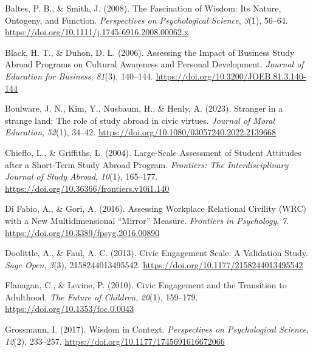 \documentclass[
  man,
  floatsintext,
  longtable,
  nolmodern,
  notxfonts,
  notimes,
  colorlinks=true,linkcolor=blue,citecolor=blue,urlcolor=blue]{apa7}
\newlength{\cslhangindent}
\newenvironment{CSLReferences}[2] %
 {\begin{list}{}{%
  \setlength{\itemindent}{0pt}
  \setlength{\leftmargin}{0pt}
  \setlength{\parsep}{0pt}
  \ifodd #1
   \setlength{\leftmargin}{\cslhangindent}
   \setlength{\itemindent}{-1\cslhangindent}
  \fi
  \setlength{\itemsep}{#2\baselineskip}}}
 {\end{list}}
\begin{document}
\label{refs}
\begin{CSLReferences}{1}{0}
Baltes, P. B., \& Smith, J. (2008). The {Fascination} of {Wisdom}: {Its
Nature}, {Ontogeny}, and {Function}. \emph{Perspectives on Psychological
Science}, \emph{3}(1), 56--64.
\url{https://doi.org/10.1111/j.1745-6916.2008.00062.x}

Black, H. T., \& Duhon, D. L. (2006). Assessing the {Impact} of
{Business Study Abroad Programs} on {Cultural Awareness} and {Personal
Development}. \emph{Journal of Education for Business}, \emph{81}(3),
140--144. \url{https://doi.org/10.3200/JOEB.81.3.140-144}

Boulware, J. N., Kim, Y., Nusbaum, H., \& Henly, A. (2023). Stranger in
a strange land: {The} role of study abroad in civic virtues.
\emph{Journal of Moral Education}, \emph{52}(1), 34--42.
\url{https://doi.org/10.1080/03057240.2022.2139668}

Chieffo, L., \& Griffiths, L. (2004). Large-{Scale Assessment} of
{Student Attitudes} after a {Short-Term Study Abroad Program}.
\emph{Frontiers: The Interdisciplinary Journal of Study Abroad},
\emph{10}(1), 165--177.
\url{https://doi.org/10.36366/frontiers.v10i1.140}

Di Fabio, A., \& Gori, A. (2016). Assessing {Workplace Relational
Civility} ({WRC}) with a {New Multidimensional} {``{Mirror}''}
{Measure}. \emph{Frontiers in Psychology}, \emph{7}.
\url{https://doi.org/10.3389/fpsyg.2016.00890}

Doolittle, A., \& Faul, A. C. (2013). Civic {Engagement Scale}: {A
Validation Study}. \emph{Sage Open}, \emph{3}(3), 2158244013495542.
\url{https://doi.org/10.1177/2158244013495542}

Flanagan, C., \& Levine, P. (2010). Civic {Engagement} and the
{Transition} to {Adulthood}. \emph{The Future of Children},
\emph{20}(1), 159--179. \url{https://doi.org/10.1353/foc.0.0043}

Grossmann, I. (2017). Wisdom in {Context}. \emph{Perspectives on
Psychological Science}, \emph{12}(2), 233--257.
\url{https://doi.org/10.1177/1745691616672066}


\end{CSLReferences}
\end{document}
